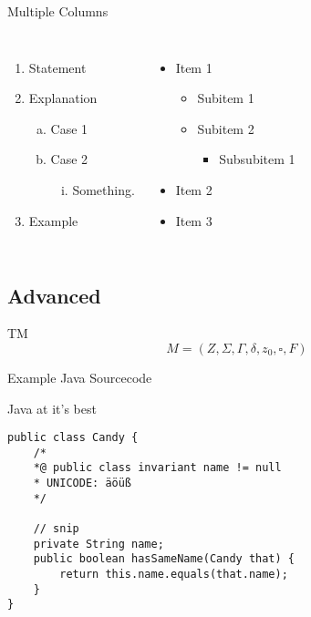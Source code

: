 \begin{frame}{Multiple Columns}
    \begin{columns}[c]
        \begin{enumerate}
            \item Statement
            \item Explanation
            \begin{enumerate}[a)]
				\item Case 1
				\item Case 2
				\begin{enumerate}[i.]
					\item Something.
				\end{enumerate}
			\end{enumerate}
            \item Example
        \end{enumerate}

        \begin{itemize}
			\item Item 1
			\begin{itemize}
				\item Subitem 1
				\item Subitem 2
				\begin{itemize}
					\item Subsubitem 1
				\end{itemize}
			\end{itemize}
			\item Item 2
			\item Item 3
		\end{itemize}

    \end{columns}
\end{frame}

\subsection{Advanced}

\begin{frame}{TM}
	$$M = (Z,\Sigma,\Gamma,\delta,z_0,\square,F)$$
\end{frame}

\begin{frame}[fragile]{Example Java Sourcecode}
	 \begin{block}{Java at it's best}
		\begin{lstlisting}
public class Candy {
    /*
    *@ public class invariant name != null
    * UNICODE: äöüß
    */

    // snip
    private String name;
    public boolean hasSameName(Candy that) {
        return this.name.equals(that.name);
    }
}\end{lstlisting}
	 \end{block}
\end{frame}

